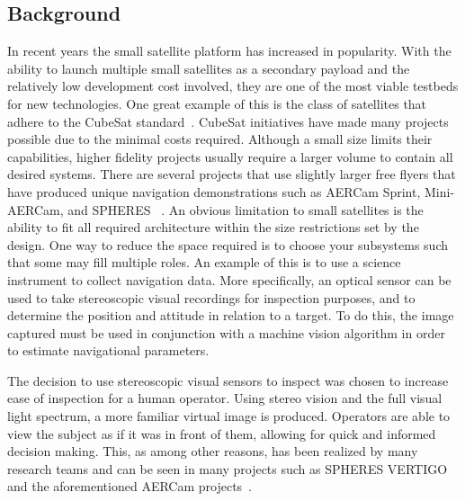 \documentclass[journal, 10pt]{IEEEtran}
\begin{document}
\subsection{Background}
In recent years the small satellite platform has increased in popularity. With the ability to launch multiple small satellites as a secondary payload and the relatively low development cost involved, they are one of the most viable testbeds for new technologies.  One great example of this is the class of satellites that adhere to the CubeSat standard~\cite{CubeSat}.   CubeSat initiatives have made many projects possible due to the minimal costs required.  Although a small size limits their capabilities, higher fidelity projects usually require a larger volume to contain all desired systems.  There are several projects that use slightly larger free flyers that have produced unique navigation demonstrations such as AERCam Sprint, Mini-AERCam, and SPHERES ~\cite{Aercam, MiniAercam, SPHERES}. An obvious limitation to small satellites is the ability to fit all required architecture within the size restrictions set by the design.  One way to reduce the space required is to choose your subsystems such that some may fill multiple roles.  An example of this is to use a science instrument to collect navigation data.  More specifically, an optical sensor can be used to take stereoscopic visual recordings for inspection purposes, and to determine the position and attitude in relation to a target.  To do this, the image captured must be used in conjunction with a machine vision algorithm in order to estimate navigational parameters.

The decision to use stereoscopic visual sensors to inspect was chosen to increase ease of inspection for a human operator.  Using stereo vision and the full visual light spectrum, a more familiar virtual image is produced.  Operators are able to view the subject as if it was in front of them, allowing for quick and informed decision making.  This, as among other reasons, has been realized by many research teams and can be seen in many projects such as SPHERES VERTIGO and the aforementioned AERCam projects~\cite{Aercam,MiniAercam, Vertigo1}.
\end{document}

